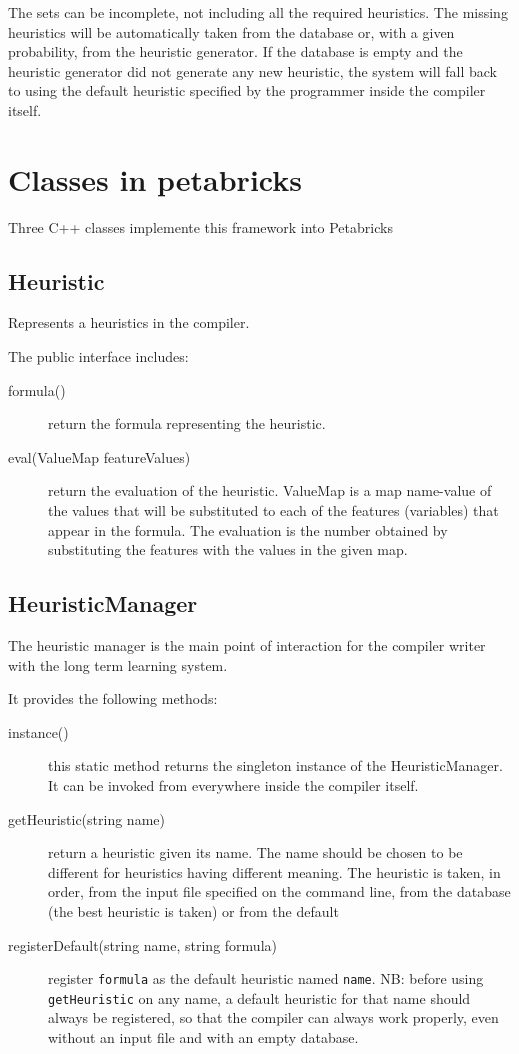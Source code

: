 \documentclass{article}
\begin{document}
The sets can be incomplete, not including all the required heuristics.
The missing heuristics will be automatically taken from the database or, with a given probability, from the heuristic generator. If the database is empty and the heuristic generator did not generate any new heuristic, the system will fall back to using the default heuristic specified by the programmer inside the compiler itself.

\section{Classes in petabricks}
Three C++ classes implemente this framework into Petabricks

\subsection{Heuristic}
Represents a heuristics in the compiler.

The public interface includes:
\begin{description}
 \item[formula()] return the formula representing the heuristic.
 \item[eval(ValueMap featureValues)] return the evaluation of the heuristic. ValueMap is a map name-value of the values that will be substituted to each of the features (variables) that appear in the formula. The evaluation is the number obtained by substituting the features with the values in the given map.
\end{description}

\subsection{HeuristicManager}
The heuristic manager is the main point of interaction for the compiler writer with the long term learning system.

It provides the following methods:
\begin{description}
 \item [instance()] this static method returns the singleton instance of the HeuristicManager. It can be invoked from everywhere inside the compiler itself.
 \item [getHeuristic(string name)] return a heuristic given its name. The name should be chosen to be different for heuristics having different meaning. The heuristic is taken, in order, from the input file specified on the command line, from the database (the best heuristic is taken) or from the default
 \item [registerDefault(string name, string formula)] register \texttt{formula} as the default heuristic named \texttt{name}. NB: before using \texttt{getHeuristic} on any name, a default heuristic for that name should always be registered, so that the compiler can always work properly, even without an input file and with an empty database.
\end{description}
\end{document}
